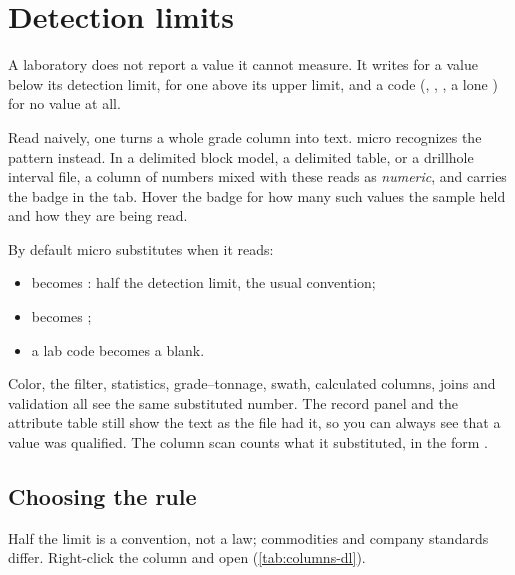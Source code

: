 \section{Detection limits}\label{sec:columns-dl}

A laboratory does not report a value it cannot measure. It writes  for a value below its detection limit,  for one above its upper limit, and a code (, , , a lone \code{-}) for no value at all.

Read naively, one  turns a whole grade column into text. micro recognizes the pattern instead. In a delimited block model, a delimited table, or a drillhole interval file, a column of numbers mixed with these reads as \emph{numeric}, and carries the  badge in the  tab. Hover the badge for how many such values the sample held and how they are being read.

By default micro substitutes when it reads:

\begin{itemize}
\item {} becomes : half the detection limit, the usual convention;
\item {} becomes ;
\item a lab code becomes a blank.
\end{itemize}

Color, the filter, statistics, grade–tonnage, swath, calculated columns, joins and validation all see the same substituted number. The record panel and the attribute table still show the text as the file had it, so you can always see that a value was qualified. The column scan counts what it substituted, in the form .

\subsection{Choosing the rule}

Half the limit is a convention, not a law; commodities and company standards differ. Right-click the column and open  (\cref{tab:columns-dl}).

